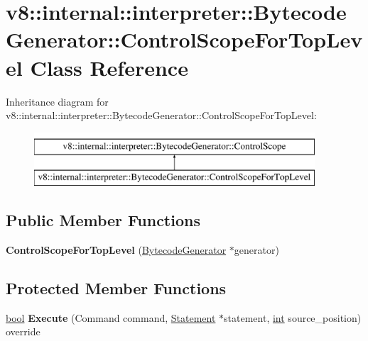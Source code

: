 \hypertarget{classv8_1_1internal_1_1interpreter_1_1BytecodeGenerator_1_1ControlScopeForTopLevel}{}\section{v8\+:\+:internal\+:\+:interpreter\+:\+:Bytecode\+Generator\+:\+:Control\+Scope\+For\+Top\+Level Class Reference}
\label{classv8_1_1internal_1_1interpreter_1_1BytecodeGenerator_1_1ControlScopeForTopLevel}
Inheritance diagram for v8\+:\+:internal\+:\+:interpreter\+:\+:Bytecode\+Generator\+:\+:Control\+Scope\+For\+Top\+Level\+:\begin{figure}[H]
\begin{center}
\leavevmode
\includegraphics[height=2.000000cm]{classv8_1_1internal_1_1interpreter_1_1BytecodeGenerator_1_1ControlScopeForTopLevel}
\end{center}
\end{figure}
\subsection*{Public Member Functions}
\begin{DoxyCompactItemize}
\item 
\mbox{\label{classv8_1_1internal_1_1interpreter_1_1BytecodeGenerator_1_1ControlScopeForTopLevel_addef45c15c883988d5e6dda9167b3900}} 
{\bfseries Control\+Scope\+For\+Top\+Level} (\mbox{\hyperlink{classv8_1_1internal_1_1interpreter_1_1BytecodeGenerator}{Bytecode\+Generator}} $\ast$generator)
\end{DoxyCompactItemize}
\subsection*{Protected Member Functions}
\begin{DoxyCompactItemize}
\item 
\mbox{\label{classv8_1_1internal_1_1interpreter_1_1BytecodeGenerator_1_1ControlScopeForTopLevel_ae229aeb773f377dedff289da397f8f15}} 
\mbox{\hyperlink{classbool}{bool}} {\bfseries Execute} (Command command, \mbox{\hyperlink{classv8_1_1internal_1_1Statement}{Statement}} $\ast$statement, \mbox{\hyperlink{classint}{int}} source\+\_\+position) override
\end{DoxyCompactItemize}
